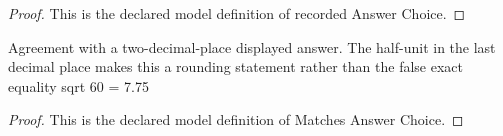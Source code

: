 \begin{proof}
  This is the declared model definition of recorded Answer Choice.
\end{proof}
\begin{definition}
  \label{def:physics:phyx-mini-0232:phyxminiproblems-problemphyxmini0232-matchesanswerchoice}
  Agreement with a two-decimal-place displayed answer. The half-unit in the last decimal place makes this a rounding statement rather than the false exact equality sqrt 60 = 7.75
\end{definition}
\begin{proof}
  This is the declared model definition of Matches Answer Choice.
\end{proof}
